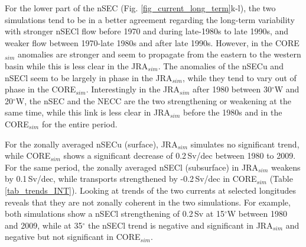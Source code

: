 \documentclass[os, manuscript]{copernicus}
\begin{document}
	For the lower part of the nSEC (Fig. \ref{fig_current_long_term}k-l), the two simulations tend to be in a better agreement regarding the long-term variability with stronger nSECl flow before 1970 and during late-1980s to late 1990s, and weaker flow between 1970-late 1980s and after late 1990s. However, in the CORE$_{sim}$ anomalies are stronger and seem to propagate from the eastern to the western basin while this is less clear in the JRA$_{sim}$. The anomalies of the nSECu and nSECl seem to be largely in phase in the JRA$_{sim}$, while they tend to vary out of phase in the CORE$_{sim}$. Interestingly in the JRA$_{sim}$ after 1980 between 30$^{\circ}$W and 20$^{\circ}$W, the nSEC and the NECC are the two strengthening or weakening at the same time, while this link is less clear in JRA$_{sim}$ before the 1980s and in the CORE$_{sim}$ for the entire period. 
	
	For the zonally averaged nSECu (surface), JRA$_{sim}$ simulates no significant trend, while CORE$_{sim}$ shows a significant decrease of 0.2$\,$Sv/dec between 1980 to 2009. For the same period, the zonally averaged nSECl (subsurface) in JRA$_{sim}$ weakens by 0.1$ \, $Sv/dec, while transports strengthened by -0.2$ \, $Sv/dec in CORE$_{sim}$ (Table \ref{tab_trends_INT}). Looking at trends of the two currents at selected longitudes reveals that they are not zonally coherent in the two simulations. For example, both simulations show a nSECl strengthening of 0.2$\,$Sv at 15$^{\circ}$W between 1980 and 2009, while at 35$^{\circ}$ the nSECl trend is negative and significant in JRA$_{sim}$ and negative but not significant in CORE$_{sim}$.
	
\end{document}
